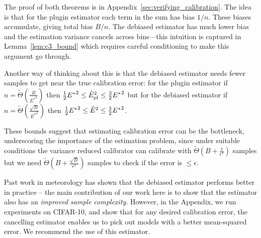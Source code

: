The proof of both theorems is in Appendix~\ref{sec:verifying_calibration}. The idea is that for the plugin estimator each term in the sum has bias $1/n$. These biases accumulate, giving total bias $B/n$. The debiased estimator has much lower bias and the estimation variance cancels across bins---this intuition is captured in Lemma~\ref{lem:c3_bound} which requires careful conditioning to make this argument go through.

Another way of thinking about this is that the debiased estimator needs fewer samples to get near the true calibration error: for the plugin estimator if $n = \widetilde{\Theta}(\frac{B}{{E^*}^2})$ then $\frac{1}{2} {E^*}^2 \leq \hat{E}_{\textup{pl}}^2{} \leq \frac{3}{2} {E^*}^2$ but for the debiased estimator if $n = \widetilde{\Theta}(\frac{\sqrt{B}}{{E^*}^2})$ then $\frac{1}{2} {E^*}^2 \leq \hat{E}^2{} \leq \frac{3}{2}{E^*}^2$.

These bounds suggest that estimating calibration error can be the bottleneck, underscoring the importance of the estimation problem, since under suitable conditions the variance reduced calibrator can calibrate with $\widetilde{\Theta}(B + \frac{1}{\epsilon^2})$ samples but we need $\widetilde{\Theta}(B + \frac{\sqrt{B}}{\epsilon^2})$ samples to check if the error is $\leq \epsilon$.

Past work in meteorology has shown that the debiased estimator performs better in practice -- the main contribution of our work here is to show that the estimator also has an \emph{improved sample complexity}. However, in the Appendix, we run experiments on CIFAR-10, and show that for any desired calibration error, the cancelling estimator enables us to pick out models with a better mean-squared error. We recommend the use of this estimator.


